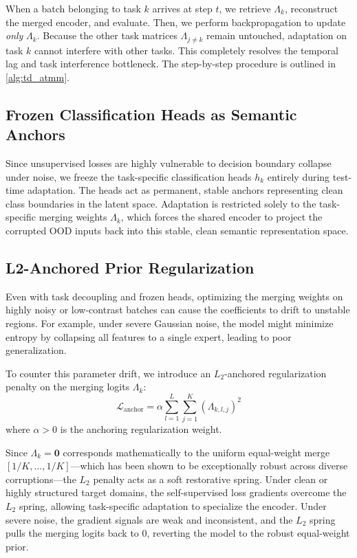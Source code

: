\documentclass{article}
\theoremstyle{plain}
\theoremstyle{definition}
\theoremstyle{remark}
\begin{document}
When a batch belonging to task $k$ arrives at step $t$, we retrieve $\Lambda_k$, reconstruct the merged encoder, and evaluate. Then, we perform backpropagation to update \emph{only} $\Lambda_k$. Because the other task matrices $\Lambda_{j \ne k}$ remain untouched, adaptation on task $k$ cannot interfere with other tasks. This completely resolves the temporal lag and task interference bottleneck. The step-by-step procedure is outlined in \cref{alg:td_atmm}.

\subsection{Frozen Classification Heads as Semantic Anchors}
Since unsupervised losses are highly vulnerable to decision boundary collapse under noise, we freeze the task-specific classification heads $h_k$ entirely during test-time adaptation. The heads act as permanent, stable anchors representing clean class boundaries in the latent space. Adaptation is restricted solely to the task-specific merging weights $\Lambda_k$, which forces the shared encoder to project the corrupted OOD inputs back into this stable, clean semantic representation space.

\subsection{L2-Anchored Prior Regularization}
Even with task decoupling and frozen heads, optimizing the merging weights on highly noisy or low-contrast batches can cause the coefficients to drift to unstable regions. For example, under severe Gaussian noise, the model might minimize entropy by collapsing all features to a single expert, leading to poor generalization.

To counter this parameter drift, we introduce an $L_2$-anchored regularization penalty on the merging logits $\Lambda_k$:
\begin{equation}
\mathcal{L}_{\text{anchor}} = \alpha \sum_{l=1}^L \sum_{j=1}^K \left(\Lambda_{k, l, j}\right)^2
\end{equation}
where $\alpha > 0$ is the anchoring regularization weight. 

Since $\Lambda_k = \mathbf{0}$ corresponds mathematically to the uniform equal-weight merge $[1/K, \dots, 1/K]$—which has been shown to be exceptionally robust across diverse corruptions—the $L_2$ penalty acts as a soft restorative spring. Under clean or highly structured target domains, the self-supervised loss gradients overcome the $L_2$ spring, allowing task-specific adaptation to specialize the encoder. Under severe noise, the gradient signals are weak and inconsistent, and the $L_2$ spring pulls the merging logits back to 0, reverting the model to the robust equal-weight prior.
\end{document}
